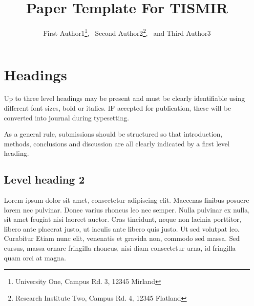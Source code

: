 \documentclass{article}
\title{Paper Template For TISMIR}
\author{First Author1\thanks{University One, Campus Rd. 3, 12345 Mirland},%
~Second Author2\thanks{Research Institute Two, Campus Rd. 4, 12345 Flatland},%
~and Third Author3\protect\footnotemark[1]}
\date{}
\begin{document}

\saythanks{}


\section{Headings}\label{sec:headings}

Up to three level headings may be present and must be clearly identifiable
using different font sizes, bold or italics. IF accepted for publication,
these will be converted into journal during typesetting.

As a general rule, submissions should be structured so that introduction,
methods, conclusions and discussion are all clearly indicated by a first level heading.

\subsection{Level heading 2}

Lorem ipsum dolor sit amet, consectetur adipiscing elit.
Maecenas finibus posuere lorem nec pulvinar. Donec varius
rhoncus leo nec semper. Nulla pulvinar ex nulla, sit amet feugiat
nisi laoreet auctor. Cras tincidunt, neque non lacinia porttitor,
libero ante placerat justo, ut iaculis ante libero quis justo.
Ut sed volutpat leo. Curabitur
Etiam nunc elit, venenatis et gravida non, commodo sed massa.
Sed cursus, massa ornare fringilla rhoncus, nisi diam consectetur urna,
id fringilla quam orci at magna.
\end{document}
